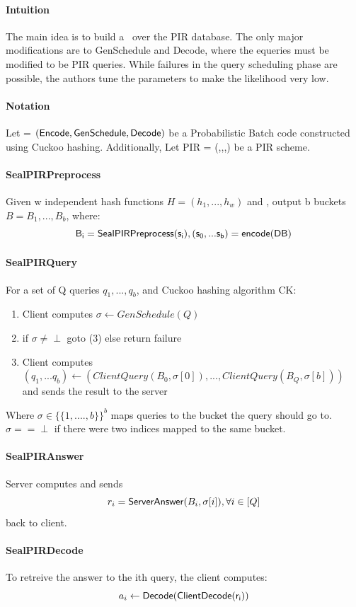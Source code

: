 {\paragraph{Intuition} The main idea is to build a \Pbc \ over the PIR database. The only major modifications
are to GenSchedule and Decode, where the equeries must be modified to be PIR queries. While failures in the query scheduling phase are
possible, the authors tune the parameters to make the likelihood very low.
\\
\paragraph{Notation}
Let \Pbc = $(\mathsf{Encode},{\sf GenSchedule},\mathsf{Decode})$ be a Probabilistic Batch code constructed using Cuckoo hashing. Additionally,
Let PIR = (\ServerPre,\ClientQ,\ServerA,\ClientD) be a PIR scheme.

\paragraph{\sf SealPIRPreprocess} Given w independent hash functions $H = (h_1,...,h_w)$ and \DB, output b buckets $B = {B_1,...,B_b}$, where:
$$\sf B_i = SealPIRPreprocess(s_i),(s_0,...s_b) = encode(DB) $$
\paragraph{\sf SealPIRQuery} For a set of Q queries $q_1,...,q_b$, and Cuckoo hashing algorithm CK:
\begin{enumerate}
    \item Client computes $\sigma \leftarrow GenSchedule(Q)$
    \item if $\sigma \neq \perp$ goto (3) else  return failure
    \item Client computes $(q_1,...q_b) \leftarrow (ClientQuery(B_0,\sigma[0]),...,ClientQuery(B_Q,\sigma[b]))$ and sends the result to the server
\end{enumerate}
Where $\sigma \in \{\{1,....,b\}\}^b$ maps queries to the bucket the query should go to. $\sigma == \perp$ if there were two indices mapped to the same bucket.

\paragraph{\sf SealPIRAnswer} Server computes and sends $$r_i = {\sf ServerAnswer}(B_i,\sigma[i]), \forall i \in [Q]$$ back to client.
\paragraph{\sf SealPIRDecode} To retreive the answer to the ith query, the client computes:
$$a_i \leftarrow \sf Decode(ClientDecode(r_i))$$




}

